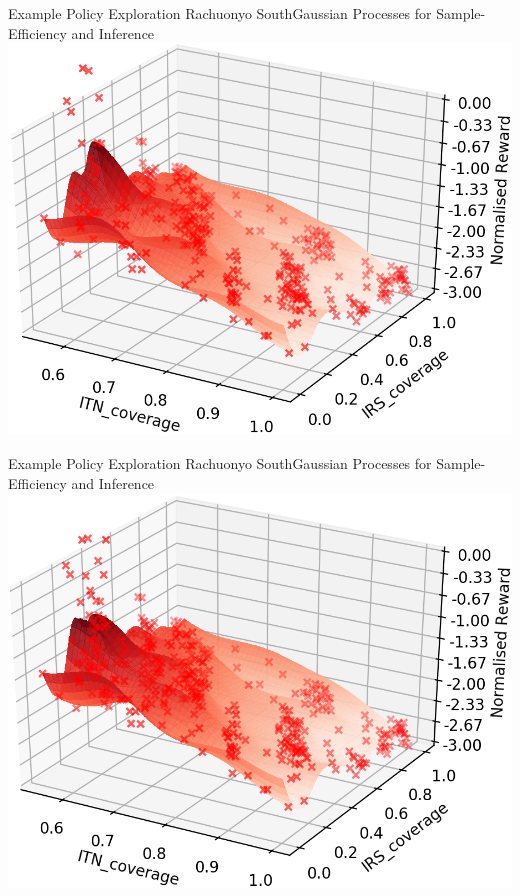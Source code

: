 \documentclass[10pt,usenames,dvipsnames]{beamer}
\begin{document}
\begin{frame}{Example Policy Exploration Rachuonyo South}{Gaussian Processes for Sample-Efficiency and Inference}
\centering
\includegraphics[width=1\textheight]{images/Batch_5.png}
\end{frame}
\begin{frame}{Example Policy Exploration Rachuonyo South}{Gaussian Processes for Sample-Efficiency and Inference}
\centering
\includegraphics[width=1\textheight]{images/Batch_6.png}
\end{frame}
\end{document}
